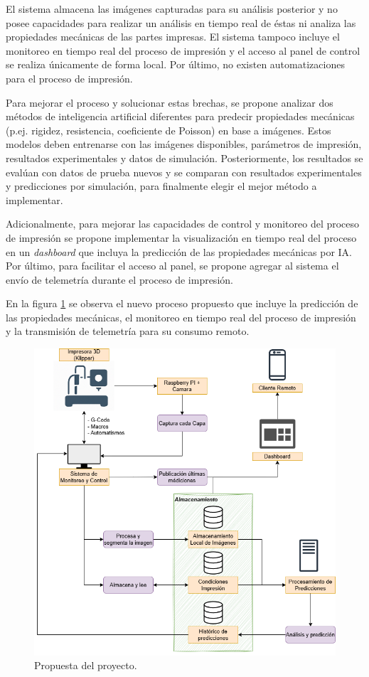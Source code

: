 \documentclass[
11pt, %
]{charter}
\begin{document}
El sistema almacena las imágenes capturadas para su análisis posterior y no posee capacidades para realizar un análisis en tiempo real de éstas ni analiza las propiedades mecánicas de las partes impresas. El sistema tampoco incluye el monitoreo en tiempo real del proceso de impresión y el acceso al panel de control se realiza únicamente de forma local. Por último, no existen automatizaciones para el proceso de impresión.

Para mejorar el proceso y solucionar estas brechas, se propone analizar dos métodos de inteligencia artificial diferentes para predecir propiedades mecánicas (p.ej. rigidez, resistencia, coeficiente de Poisson) en base a imágenes. Estos modelos deben entrenarse con las imágenes disponibles, parámetros de impresión, resultados experimentales y datos de simulación. Posteriormente, los resultados se evalúan con datos de prueba nuevos y se comparan con resultados experimentales y predicciones por simulación, para finalmente elegir el mejor método a implementar.

Adicionalmente, para mejorar las capacidades de control y monitoreo del proceso de impresión se propone implementar la visualización en tiempo real del proceso en un \textit{dashboard} que incluya la predicción de las propiedades mecánicas por IA. Por último, para facilitar el acceso al panel, se propone agregar al sistema el envío de telemetría durante el proceso de impresión.

En la figura \ref{fig:procesoPropuesta} se observa el nuevo proceso propuesto que incluye la predicción de las propiedades mecánicas, el monitoreo en tiempo real del proceso de impresión y la transmisión de telemetría para su consumo remoto. 

\begin{figure}[htpb]
\centering 
\includegraphics[width=.8\textwidth]{Figuras/proceso-Propuesto.png}
\caption{Propuesta del proyecto.}
\label{fig:procesoPropuesta}
\end{figure}
\end{document}
